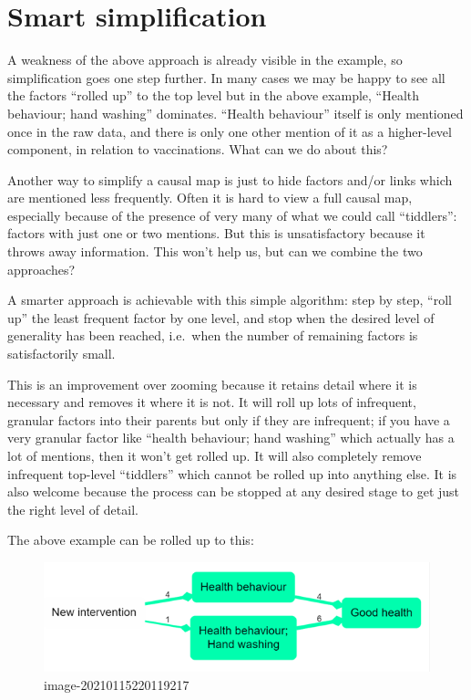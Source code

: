 \documentclass[
]{book}
\begin{document}
\hypertarget{smart-simplification}{%
\section{Smart simplification}\label{smart-simplification}}

A weakness of the above approach is already visible in the example, so simplification goes one step further. In many cases we may be happy to see all the factors ``rolled up'' to the top level but in the above example, ``Health behaviour; hand washing'' dominates. ``Health behaviour'' itself is only mentioned once in the raw data, and there is only one other mention of it as a higher-level component, in relation to vaccinations. What can we do about this?

Another way to simplify a causal map is just to hide factors and/or links which are mentioned less frequently. Often it is hard to view a full causal map, especially because of the presence of very many of what we could call ``tiddlers'': factors with just one or two mentions. But this is unsatisfactory because it throws away information. This won't help us, but can we combine the two approaches?

A smarter approach is achievable with this simple algorithm: step by step, ``roll up'' the least frequent factor by one level, and stop when the desired level of generality has been reached, i.e.~when the number of remaining factors is satisfactorily small.

This is an improvement over zooming because it retains detail where it is necessary and removes it where it is not. It will roll up lots of infrequent, granular factors into their parents but only if they are infrequent; if you have a very granular factor like ``health behaviour; hand washing'' which actually has a lot of mentions, then it won't get rolled up. It will also completely remove infrequent top-level ``tiddlers'' which cannot be rolled up into anything else. It is also welcome because the process can be stopped at any desired stage to get just the right level of detail.

The above example can be rolled up to this:

\begin{figure}
\centering
\includegraphics[width=6.77083in,height=\textheight]{_assets/image-20210115220119217.png}
\caption{image-20210115220119217}
\end{figure}
\end{document}
